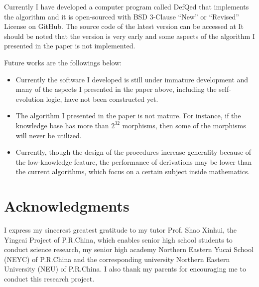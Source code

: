 \documentclass{article}
\begin{document}
Currently I have developed a computer program called DefQed that implements the algorithm and it is open-sourced with BSD 3-Clause {``}New{''} or {``}Revised{''} License on GitHub. The source code of the latest version can be accessed at \cite{7} It should be noted that the version is very early and some aspects of the algorithm I presented in the paper is not implemented.

Future works are the followings below:
\begin{itemize}
	\item {} Currently the software I developed is still under immature development and many of the aspects I presented in the paper above, including the self-evolution logic, have not been constructed yet.
	\item  {} The algorithm I presented in the paper is not mature. For instance, if the knowledge base has more than \(2^{32}\) morphisms, then some of the morphisms will never be utilized.
	\item {} Currently, though the design of the procedures increase generality because of the low-knowledge feature, the performance of derivations may be lower than the current algorithms, which focus on a certain subject inside mathematics.
\end{itemize}

\section*{Acknowledgments}
I express my sincerest greatest gratitude to my tutor Prof. Shao Xinhui, the Yingcai Project of P.R.China, which enables senior high school students to conduct science research, my senior high academy Northern Eastern Yucai School (NEYC) of P.R.China and the corresponding university Northern Eastern University (NEU) of P.R.China. I also thank my parents for encouraging me to conduct this research project.



\end{document}
